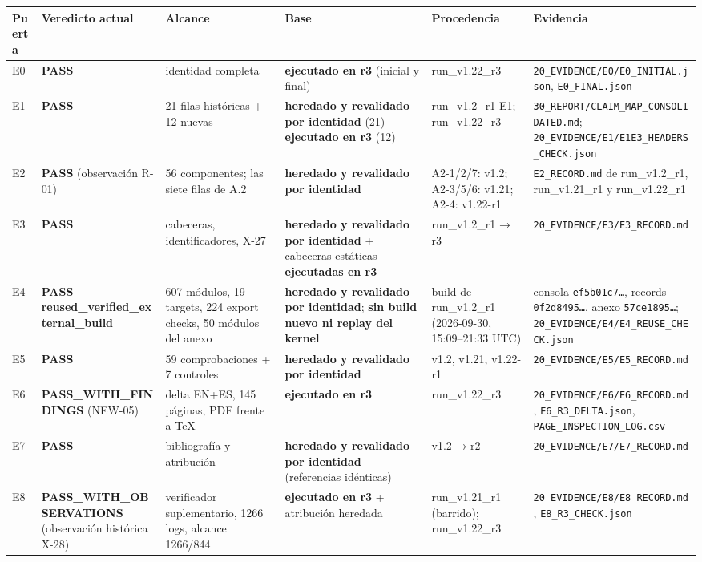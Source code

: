 \documentclass[
]{article}
\newcounter{none} %
\begin{document}
{\def\LTcaptype{none} %
\begin{longtable}[]{@{}llllll@{}}
\toprule\noalign{}
Puerta & Veredicto actual & Alcance & Base & Procedencia & Evidencia \\
\midrule\noalign{}
\endhead
\bottomrule\noalign{}
\endlastfoot
E0 & \textbf{PASS} & identidad completa & \textbf{ejecutado en r3}
(inicial y final) & run\_v1.22\_r3 &
\texttt{20\_EVIDENCE/E0/E0\_INITIAL.json}, \texttt{E0\_FINAL.json} \\
E1 & \textbf{PASS} & 21 filas históricas + 12 nuevas & \textbf{heredado
y revalidado por identidad} (21) + \textbf{ejecutado en r3} (12) &
run\_v1.2\_r1 E1; run\_v1.22\_r3 &
\texttt{30\_REPORT/CLAIM\_MAP\_CONSOLIDATED.md};
\texttt{20\_EVIDENCE/E1/E1E3\_HEADERS\_CHECK.json} \\
E2 & \textbf{PASS} (observación R-01) & 56 componentes; las siete filas
de A.2 & \textbf{heredado y revalidado por identidad} & A2-1/2/7: v1.2;
A2-3/5/6: v1.21; A2-4: v1.22-r1 & \texttt{E2\_RECORD.md} de
run\_v1.2\_r1, run\_v1.21\_r1 y run\_v1.22\_r1 \\
E3 & \textbf{PASS} & cabeceras, identificadores, X-27 & \textbf{heredado
y revalidado por identidad} + cabeceras estáticas \textbf{ejecutadas en
r3} & run\_v1.2\_r1 → r3 & \texttt{20\_EVIDENCE/E3/E3\_RECORD.md} \\
E4 & \textbf{PASS --- reused\_verified\_external\_build} & 607 módulos,
19 targets, 224 export checks, 50 módulos del anexo & \textbf{heredado y
revalidado por identidad}; \textbf{sin build nuevo ni replay del kernel}
& build de run\_v1.2\_r1 (2026-09-30, 15:09--21:33 UTC) & consola
\texttt{ef5b01c7…}, records \texttt{0f2d8495…}, anexo
\texttt{57ce1895…}; \texttt{20\_EVIDENCE/E4/E4\_REUSE\_CHECK.json} \\
E5 & \textbf{PASS} & 59 comprobaciones + 7 controles & \textbf{heredado
y revalidado por identidad} & v1.2, v1.21, v1.22-r1 &
\texttt{20\_EVIDENCE/E5/E5\_RECORD.md} \\
E6 & \textbf{PASS\_WITH\_FINDINGS} (NEW-05) & delta EN+ES, 145 páginas,
PDF frente a TeX & \textbf{ejecutado en r3} & run\_v1.22\_r3 &
\texttt{20\_EVIDENCE/E6/E6\_RECORD.md}, \texttt{E6\_R3\_DELTA.json},
\texttt{PAGE\_INSPECTION\_LOG.csv} \\
E7 & \textbf{PASS} & bibliografía y atribución & \textbf{heredado y
revalidado por identidad} (referencias idénticas) & v1.2 → r2 &
\texttt{20\_EVIDENCE/E7/E7\_RECORD.md} \\
E8 & \textbf{PASS\_WITH\_OBSERVATIONS} (observación histórica X-28) &
verificador suplementario, 1266 logs, alcance 1266/844 &
\textbf{ejecutado en r3} + atribución heredada & run\_v1.21\_r1
(barrido); run\_v1.22\_r3 & \texttt{20\_EVIDENCE/E8/E8\_RECORD.md},
\texttt{E8\_R3\_CHECK.json} \\
\end{longtable}
}
\end{document}
